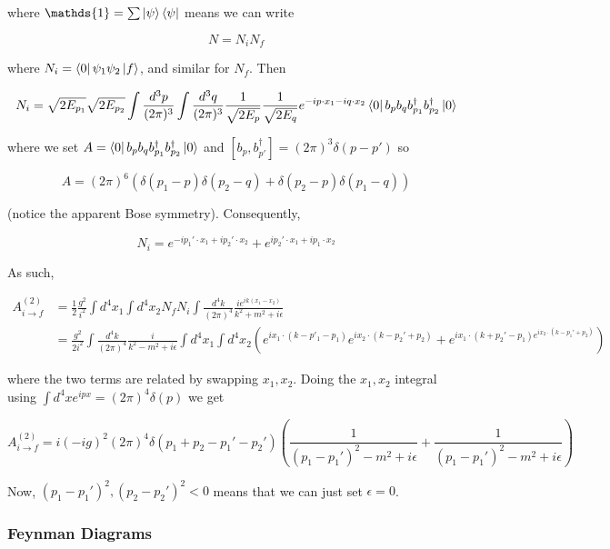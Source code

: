 \documentclass{article}
\theoremstyle{definition}
\begin{document}
where $\mathds{1} = \sum \ket{\psi} \bra{\psi}$  means we can write

$$ N = N_i N_f $$

where $N_i = \bra{0} \psi_1 \psi_2 \ket{f}$, and similar for $N_f$. Then

$$ N_i = \sqrt{2 E_{p_1}} \sqrt{2 E_{p_2}} \int \frac{d^3p}{(2\pi)^3} \int
\frac{d^3q}{(2\pi)^3} \frac{1}{\sqrt{2 E_p}} \frac{1}{\sqrt{2 E_q}} e^{-ip \cdot
  x_1 - i q \cdot x_2} \bra{0} b_p b_q b_{p_1}^\dagger b_{p_2}^\dagger \ket{0} $$

where we set $A = \bra{0} b_p b_q b_{p_1}^\dagger b_{p_2}^\dagger \ket{0}$ and
$[b_p, b_{p'}^\dagger] = (2\pi)^3 \delta(p - p')$ so

$$ A = (2\pi)^6 (\delta(p_1 - p) \delta(p_2 - q) + \delta(p_2 - p) \delta(p_1 -
q)) $$

(notice the apparent Bose symmetry). Consequently,

$$ N_i = e^{-i p_1' \cdot x_1 + i p_2' \cdot x_2} + e^{ip_2' \cdot x_1 + ip_1
  \cdot x_2 } $$

As such,

\begin{align*}
  A_{i \to f}^{(2)} &= \frac{1}{2} \frac{g^2}{i^2} \int d^4 x_1
                      \int d^4 x_2 N_f N_i
                      \int \frac{d^4k}{(2\pi)^4}
                      \frac{i e^{ik(x_1 - x_2)}}{k^2 + m^2 + i \epsilon} \\
                    &= \frac{g^2}{2i^2} \int \frac{d^4k}{(2\pi)^4}
                      \frac{i}{k^2 - m^2 + i\epsilon} \int d^4 x_1 \int d^4 x_2
                      \left( e^{ix_1 \cdot (k - p'_1 -p_1)} e^{ix_2 \cdot (k - p_2' + p_2)}
                      + e^{i x_1 \cdot (k + p_2' - p_1) e^{ix_2 \cdot (k - p_1' + p_2)}} \right)
\end{align*}

where the two terms are related by swapping $x_1, x_2$. Doing the $x_1, x_2$
integral using $\int d^4x e^{ipx} = (2\pi)^4 \delta(p)$ we get

$$ A_{i \to f}^{(2)} = i(-ig)^2 (2\pi)^4 \delta(p_1 + p_2 - p_1' - p_2') \left(
  \frac{1}{(p_1 - p_1')^2 - m^2 + i\epsilon} + \frac{1}{(p_1 - p_1')^2 - m^2 +
    i\epsilon} \right) $$

Now, $(p_1 - p_1')^2, (p_2 - p_2')^2 < 0$ means that we can just set $\epsilon =
0$.

\subsubsection{Feynman Diagrams}
\end{document}
